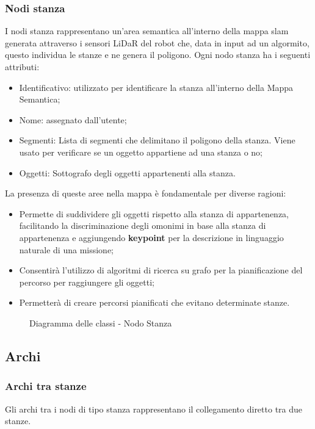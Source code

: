 \subsubsection{Nodi stanza}
I nodi stanza rappresentano un'area semantica all'interno della mappa slam generata attraverso i sensori LiDaR del robot che, data in input ad un algormito, questo individua le stanze e ne genera il poligono.
Ogni nodo stanza ha i seguenti attributi:
\begin{itemize}
  \item Identificativo: utilizzato per identificare la stanza all'interno della Mappa Semantica;
  \item Nome: assegnato dall'utente;
  \item Segmenti: Lista di segmenti che delimitano il poligono della stanza. Viene usato per verificare se un oggetto appartiene ad una stanza o no;
  \item Oggetti: Sottografo degli oggetti appartenenti alla stanza.
\end{itemize}
La presenza di queste aree nella mappa è fondamentale per diverse ragioni:
\begin{itemize}
  \item Permette di suddividere gli oggetti rispetto alla stanza di appartenenza, facilitando la discriminazione degli omonimi in base alla stanza di appartenenza e aggiungendo \textbf{keypoint} per la descrizione in linguaggio naturale di una missione;
  \item Consentirà l'utilizzo di algoritmi di ricerca su grafo per la pianificazione del percorso per raggiungere gli oggetti;
  \item Permetterà di creare percorsi pianificati che evitano determinate stanze.
\end{itemize}

\begin{figure}[h]
  \centering
  \caption{Diagramma delle classi - Nodo Stanza}
\end{figure}
\subsection{Archi}
\subsubsection{Archi tra stanze}
Gli archi tra i nodi di tipo stanza rappresentano il collegamento diretto tra due stanze.
